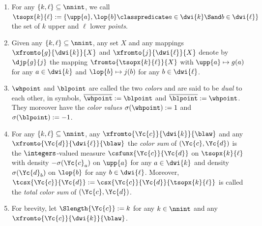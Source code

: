 \documentclass[pdftex]{sigma}
\numberwithin{equation}{section}
\begin{document}
\begin{Definition}\quad
  \label{definition:points-colors}
  \newcommand{\inlen}{k}
  \newcommand{\outlen}{\ell}
  \newcommand{\inind}{a}
  \newcommand{\outind}{b}
  \newcommand{\codset}{X}
  \newcommand{\upmap}{g}
  \newcommand{\lomap}{j}
  \newcommand{\incol}{\Yc{c}}
  \newcommand{\incolx}[1]{\incol_{#1}}
  \newcommand{\outcol}{\Yc{d}}
  \newcommand{\outcolx}[1]{\outcol_{#1}}
  \newcommand{\thepartition}{p}
  \begin{enumerate}
\item\label{definition:points-colors-1} For any $\{\inlen,\outlen\}\subseteq \nnint$, we call $\tsopx{\inlen}{\outlen}:= \{\upp{\inind},\lop{\outind}\classpredicate \inind\in\dwi{\inlen}\Sand \outind\in\dwi{\outlen}\}$ the set of $\inlen$ upper and $\outlen$ lower \emph{points}.
\item\label{definition:points-colors-2} Given any $\{\inlen,\outlen\}\subseteq \nnint$, any set $\codset$ and any mappings $\xfromto{\upmap}{\dwi{\inlen}}{\codset}$ and $\xfromto{\lomap}{\dwi{\outlen}}{\codset}$ denote by~$\djp{\upmap}{\lomap}$ the mapping $\fromto{\tsopx{\inlen}{\outlen}}{\codset}$ with $\upp{\inind}\mapsto \upmap(\inind)$ for any $\inind\in\dwi{\inlen}$ and $\lop{\outind}\mapsto \lomap(\outind)$ for any $\outind\in\dwi{\outlen}$.
\item\label{definition:points-colors-3} $\whpoint$ and $\blpoint$ are called the two \emph{colors} and are said to  be \emph{dual} to each other, in symbols, $\overline{\whpoint}:= \blpoint$ and $\overline{\blpoint}:= \whpoint$. They moreover have the \emph{color values} $\sigma(\whpoint):= 1$ and $\sigma(\blpoint):= -1$.
  \item\label{definition:points-colors-4} For any $\{\inlen,\outlen\}\subseteq \nnint$, any $\xfromto{\incol}{\dwi{\inlen}}{\blaw}$ and any $\xfromto{\outcol}{\dwi{\outlen}}{\blaw}$ the \emph{color sum} of $(\incol,\outcol)$ is the $\integers$-valued measure $\csfunx{\incol}{\outcol}$ on $\tsopx{\inlen}{\outlen}$ with density $-\sigma(\incolx{\inind})$ on $\upp{\inind}$ for any $\inind\in\dwi{\inlen}$ and density $\sigma(\outcolx{\outind})$ on $\lop{\outind}$ for any $\outind\in\dwi{\outlen}$. Moreover, $\tcsx{\incol}{\outcol}:= \csx{\incol}{\outcol}{\tsopx{\inlen}{\outlen}}$ is called the \emph{total color sum} of  $(\incol,\outcol)$.
  \item\label{definition:points-colors-5} For brevity, let $\Slength{\incol}:= \inlen$ for any $\inlen\in \nnint$ and any $\xfromto{\incol}{\dwi{\inlen}}{\blaw}$.
  \end{enumerate}
\end{Definition}
\end{document}
